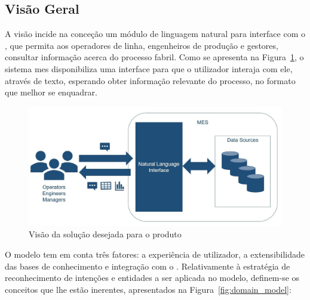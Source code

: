 \subsection{Visão Geral}
A visão incide na conceção um módulo de linguagem natural para interface com o {\productname}, que permita aos operadores de linha, engenheiros de produção e gestores, consultar informação acerca do processo fabril. Como se apresenta na Figura~\ref{fig:generic-vision}, o sistema \gls{mes} disponibiliza uma interface para que o utilizador interaja com ele, através de texto, esperando obter informação relevante do processo, no formato que melhor se enquadrar.
%
\begin{figure}[!ht]
    \centering
    \includegraphics[width=.9\textwidth]{ch04/assets/generic-vision.jpg}
    \caption{Visão da solução desejada para o produto}
    \label{fig:generic-vision}
\end{figure}

O modelo tem em conta três fatores: a experiência de utilizador, a extensibilidade das bases de conhecimento e integração com o {\productname}. Relativamente à estratégia de reconhecimento de intenções e entidades a ser aplicada no modelo, definem-se os conceitos que lhe estão inerentes, apresentados na Figura~\ref{fig:domain_model}:


